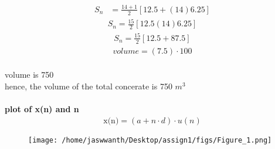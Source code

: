 \documentclass[journal,12pt,twocolumn]{IEEEtran}
\theoremstyle{remark}
\begin{document}
\\
\begin{align}
    \\S_n &= \frac{14+1}{2} [12.5+(14)6.25]
\end{align}
\begin{align}
S_n = \frac{15}{2}[12.5(14)6.25]
\end{align}
   \begin{align}
   S_n = \frac{15}{2} [12.5+87.5]
   \end{align}
   \begin{align}
   volume=(7.5) \cdot 100
   \end{align}
\\    volume is  750
\\hence, the volume of the total concerate is 750 $m^3$
\\\\\textbf{plot of x(n) and n}
\\\begin{align}
    \text{{x(n)}}=(a+n \cdot d ) \cdot u(n)
\end{align}
\begin{figure}[h]
    \renewcommand\thefigure{1}
    \centering
    \captionsetup{justification=centering}
    \texttt{[image: /home/jaswwanth/Desktop/assign1/figs/Figure\_1.png]}
    \caption{}
    \label{stemplot2}
\end{figure}


 
\end{document}
